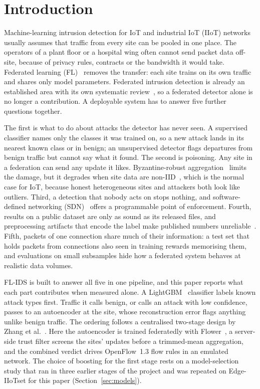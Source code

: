 \section{Introduction}
\label{sec:intro}
Machine-learning intrusion detection for IoT and industrial IoT (IIoT) networks usually assumes that traffic from every site can be pooled in one place. The operators of a plant floor or a hospital wing often cannot send packet data off-site, because of privacy rules, contracts or the bandwidth it would take. Federated learning (FL)~\cite{mcmahan2017} removes the transfer: each site trains on its own traffic and shares only model parameters. Federated intrusion detection is already an established area with its own systematic review~\cite{hernandez2025}, so a federated detector alone is no longer a contribution. A deployable system has to answer five further questions together.

The first is what to do about attacks the detector has never seen. A supervised classifier names only the classes it was trained on, so a new attack lands in its nearest known class or in benign; an unsupervised detector flags departures from benign traffic but cannot say what it found. The second is poisoning. Any site in a federation can send any update it likes. Byzantine-robust aggregation~\cite{blanchard2017,yin2018,cao2021fltrust} limits the damage, but it degrades when site data are non-IID~\cite{li2024experimental}, which is the normal case for IoT, because honest heterogeneous sites and attackers both look like outliers. Third, a detection that nobody acts on stops nothing, and software-defined networking (SDN)~\cite{mckeown2008} offers a programmable point of enforcement. Fourth, results on a public dataset are only as sound as its released files, and preprocessing artifacts that encode the label make published numbers unreliable~\cite{galal2026,arp2022,engelen2021}. Fifth, packets of one connection share much of their information: a test set that holds packets from connections also seen in training rewards memorising them, and evaluations on small subsamples hide how a federated system behaves at realistic data volumes.

FL-IDS is built to answer all five in one pipeline, and this paper reports what each part contributes when measured alone. A LightGBM~\cite{ke2017} classifier labels known attack types first. Traffic it calls benign, or calls an attack with low confidence, passes to an autoencoder at the site, whose reconstruction error flags anything unlike benign traffic. The ordering follows a centralised two-stage design by Zhang et al.~\cite{zhang2023twostage}. Here the autoencoder is trained federatedly with Flower~\cite{beutel2020}, a server-side trust filter screens the sites' updates before a trimmed-mean aggregation, and the combined verdict drives OpenFlow~1.3 flow rules in an emulated network. The choice of boosting for the first stage rests on a model-selection study that ran in three earlier stages of the project and was repeated on Edge-IIoTset for this paper (Section~\ref{sec:models}).

